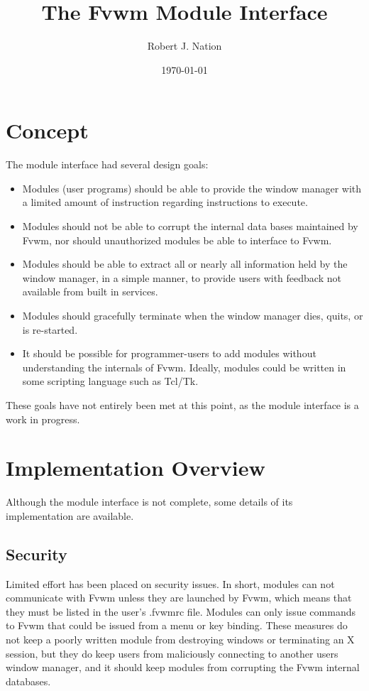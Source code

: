 \setlength{\textwidth}{6in}
\setlength{\oddsidemargin}{.25in}
\setlength{\topmargin}{0in}
\setlength{\textheight}{8in}
\setcounter{secnumdepth}{2}


\title {The Fvwm Module Interface}
\date{\today}
\author	{Robert J. Nation}
\maketitle

\section{Concept}
The module interface had several design goals:
\begin{itemize}
\item{Modules (user programs) should be able to provide the window
manager with a limited amount of instruction regarding instructions to
execute.}
\item{Modules should not be able to corrupt the internal data bases
maintained by Fvwm, nor should unauthorized modules be able to
interface to Fvwm.}
\item{Modules should be able to extract all or nearly all information
held by the window manager, in a simple manner, to provide users with
feedback not available from built in services.}
\item{Modules should gracefully terminate when the window manager
dies, quits, or is re-started.}
\item{It should be possible for programmer-users to add modules
without understanding the internals of Fvwm. Ideally, modules could be
written in some scripting language such as Tcl/Tk.}
\end{itemize}
These goals have not entirely been met at this point, as the module
interface is a work in progress. 

\section{Implementation Overview}
Although the module interface is not complete, some details of its
implementation are available.
\subsection{Security}
Limited effort has been placed on security issues. In short, modules
can not communicate with Fvwm unless they are launched by Fvwm, which
means that they must be listed in the user's .fvwmrc file.
Modules can only issue commands to Fvwm that could be issued from a
menu or key binding. These measures do not keep a poorly written
module from destroying windows or terminating an X session, but they
do keep users from maliciously connecting to another users window
manager, and it should keep modules from corrupting the Fvwm internal 
databases.
